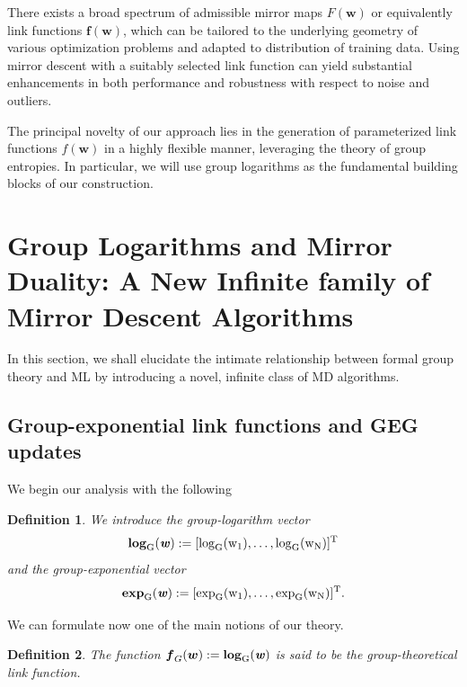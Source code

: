 \documentclass[10pt]{amsart}
\newcommand{\bi}[1]{\textbf{\textit{#1}}}
\newcommand{\bof}{\boldsymbol{f}}
\newcommand{\bw}{\boldsymbol{w}}
\newtheorem{definition}{Definition}
\theoremstyle{definition}
\theoremstyle{definition}	 %
\begin{document}
There exists a broad spectrum of admissible mirror maps
$F(\bw)$ or equivalently link functions $\bof(\bw)$, which can be tailored to the underlying geometry of various optimization problems and adapted to distribution of training data. Using mirror descent with a suitably selected link function can yield substantial enhancements in both performance and robustness with respect to noise and outliers.

The principal novelty of our approach lies in the generation of parameterized link functions $f(\bw)$ in a highly flexible manner, leveraging the theory of group entropies. In particular, we will use group logarithms as the fundamental building blocks of our construction.



\section{Group Logarithms and Mirror Duality: A New Infinite family of Mirror Descent  Algorithms} \label{Sec4}

In this section, we shall elucidate the intimate relationship between formal group theory and ML by introducing a novel, infinite class of MD algorithms.

\subsection{Group-exponential link functions and GEG updates}
We begin our analysis with the following
\begin{definition}
We introduce the group-logarithm vector  $$\rm{\bf{log}}_G(\bi w):= [\log_{G}(w_1),\ldots, \log_{G}(w_N)]^T$$ and the group-exponential vector $$\rm{\bf{exp}}_{G}(\bi w):=[\exp_{G}(w_1), \ldots, \exp_{G}(w_N)]^{T}.$$
\end{definition}
We can formulate now one of the main notions of our theory.
\begin{definition}
The function $\bof_{G}(\bw):= \rm{\bf{log}}_G(\bi w)$ is said to be the group-theoretical link function.
\end{definition}
\end{document}
